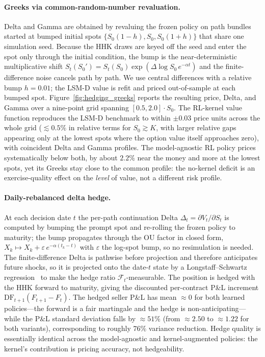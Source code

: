 \documentclass[a4paper,fleqn]{cas-dc}
\begin{document}
\paragraph{Greeks via common-random-number revaluation.}
Delta and Gamma are obtained by revaluing the frozen policy on path bundles started at bumped initial spots $\{S_0(1-h),S_0,S_0(1+h)\}$ that share one simulation seed. Because the HHK draws are keyed off the seed and enter the spot only through the initial condition, the bump is the near-deterministic multiplicative shift $S_t(S_0')=S_t(S_0)\exp(\Delta\log S_0\,e^{-\alpha t})$ and the finite-difference noise cancels path by path. We use central differences with a relative bump $h=0.01$; the LSM-D value is refit and priced out-of-sample at each bumped spot. Figure~\ref{fig:hedging_greeks} reports the resulting price, Delta, and Gamma over a nine-point grid spanning $[0.5,2.0]\cdot S_0$. The RL-kernel value function reproduces the LSM-D benchmark to within $\pm 0.03$ price units across the whole grid ($\lesssim 0.5\%$ in relative terms for $S_0\gtrsim K$, with larger relative gaps appearing only at the lowest spots where the option value itself approaches zero), with coincident Delta and Gamma profiles. The model-agnostic RL policy prices systematically below both, by about $2.2\%$ near the money and more at the lowest spots, yet its Greeks stay close to the common profile: the no-kernel deficit is an exercise-quality effect on the \emph{level} of value, not a different risk profile.

\paragraph{Daily-rebalanced delta hedge.}
At each decision date $t$ the per-path continuation Delta $\Delta_t=\partial V_t/\partial S_t$ is computed by bumping the prompt spot and re-rolling the frozen policy to maturity; the bump propagates through the OU factor in closed form, $X_k\mapsto X_k+\varepsilon\, e^{-\alpha(t_k-t)}$ with $\varepsilon$ the log-spot bump, so no resimulation is needed. The finite-difference Delta is pathwise before projection and therefore anticipates future shocks, so it is projected onto the date-$t$ state by a Longstaff--Schwartz regression~\cite{longstaff2001valuing} to make the hedge ratio $\mathcal F_t$-measurable. The position is hedged with the HHK forward to maturity, giving the discounted per-contract P\&L increment $\mathrm{DF}_{t+1}(F_{t+1}-F_t)$. The hedged seller P\&L has mean $\approx 0$ for both learned policies---the forward is a fair martingale and the hedge is non-anticipating---while the P\&L standard deviation falls by $\approx 51\%$ (from $\approx 2.50$ to $\approx 1.22$ for both variants), corresponding to roughly $76\%$ variance reduction. Hedge quality is essentially identical across the model-agnostic and kernel-augmented policies: the kernel's contribution is pricing accuracy, not hedgeability.
\end{document}
